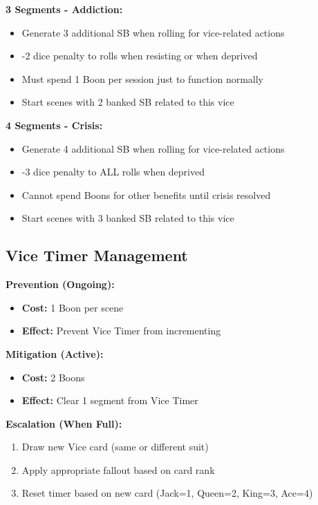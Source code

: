 \documentclass[11pt]{article}
\begin{document}
\textbf{3 Segments - Addiction:}
\begin{itemize}
    \item Generate 3 additional SB when rolling for vice-related actions
    \item -2 dice penalty to rolls when resisting or when deprived
    \item Must spend 1 Boon per session just to function normally
    \item Start scenes with 2 banked SB related to this vice
\end{itemize}

\textbf{4 Segments - Crisis:}
\begin{itemize}
    \item Generate 4 additional SB when rolling for vice-related actions
    \item -3 dice penalty to ALL rolls when deprived
    \item Cannot spend Boons for other benefits until crisis resolved
    \item Start scenes with 3 banked SB related to this vice
\end{itemize}

\subsection{Vice Timer Management}

\textbf{Prevention (Ongoing):}
\begin{itemize}
    \item \textbf{Cost:} 1 Boon per scene
    \item \textbf{Effect:} Prevent Vice Timer from incrementing
\end{itemize}

\textbf{Mitigation (Active):}
\begin{itemize}
    \item \textbf{Cost:} 2 Boons
    \item \textbf{Effect:} Clear 1 segment from Vice Timer 
\end{itemize}

\textbf{Escalation (When Full):}
\begin{enumerate}
    \item Draw new Vice card (same or different suit)
    \item Apply appropriate fallout based on card rank
    \item Reset timer based on new card (Jack=1, Queen=2, King=3, Ace=4)
\end{enumerate}
\end{document}
